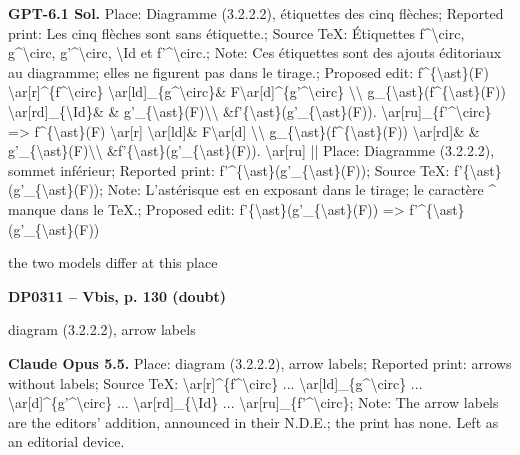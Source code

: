 \textbf{GPT-6.1 Sol.} Place: Diagramme (3.2.2.2), étiquettes des cinq flèches; Reported print: Les cinq flèches sont sans étiquette.; Source TeX: Étiquettes f\textasciicircum{}\textbackslash{}circ, g\textasciicircum{}\textbackslash{}circ, g'\textasciicircum{}\textbackslash{}circ, \textbackslash{}Id et f'\textasciicircum{}\textbackslash{}circ.; Note: Ces étiquettes sont des ajouts éditoriaux au diagramme; elles ne figurent pas dans le tirage.; Proposed edit: f\textasciicircum{}\{\textbackslash{}ast\}(F) \textbackslash{}ar[r]\textasciicircum{}\{f\textasciicircum{}\textbackslash{}circ\} \textbackslash{}ar[ld]\_\{g\textasciicircum{}\textbackslash{}circ\}\& F\textbackslash{}ar[d]\textasciicircum{}\{g'\textasciicircum{}\textbackslash{}circ\} \textbackslash{}\textbackslash{} g\_\{\textbackslash{}ast\}(f\textasciicircum{}\{\textbackslash{}ast\}(F))  \textbackslash{}ar[rd]\_\{\textbackslash{}Id\}\&             \& g'\_\{\textbackslash{}ast\}(F)\textbackslash{}\textbackslash{}                       \&f'\{\textbackslash{}ast\}(g'\_\{\textbackslash{}ast\}(F)). \textbackslash{}ar[ru]\_\{f'\textasciicircum{}\textbackslash{}circ\} =\allowbreak > f\textasciicircum{}\{\textbackslash{}ast\}(F) \textbackslash{}ar[r] \textbackslash{}ar[ld]\& F\textbackslash{}ar[d] \textbackslash{}\textbackslash{} g\_\{\textbackslash{}ast\}(f\textasciicircum{}\{\textbackslash{}ast\}(F))  \textbackslash{}ar[rd]\&             \& g'\_\{\textbackslash{}ast\}(F)\textbackslash{}\textbackslash{}                       \&f'\{\textbackslash{}ast\}(g'\_\{\textbackslash{}ast\}(F)). \textbackslash{}ar[ru] || Place: Diagramme (3.2.2.2), sommet inférieur; Reported print: f'\textasciicircum{}\{\textbackslash{}ast\}(g'\_\{\textbackslash{}ast\}(F)); Source TeX: f'\{\textbackslash{}ast\}(g'\_\{\textbackslash{}ast\}(F)); Note: L'astérisque est en exposant dans le tirage; le caractère \textasciicircum{} manque dans le TeX.; Proposed edit: f'\{\textbackslash{}ast\}(g'\_\{\textbackslash{}ast\}(F)) =\allowbreak > f'\textasciicircum{}\{\textbackslash{}ast\}(g'\_\{\textbackslash{}ast\}(F))\par
the two models differ at this place\par
\par\noindent\hypertarget{DP0311}{}\textbf{DP0311 -- Vbis, p. 130 (doubt)}\par
diagram (3.2.2.2), arrow labels\par
\textbf{Claude Opus 5.5.} Place: diagram (3.2.2.2), arrow labels; Reported print: arrows without labels; Source TeX: \textbackslash{}ar[r]\textasciicircum{}\{f\textasciicircum{}\textbackslash{}circ\} ... \textbackslash{}ar[ld]\_\{g\textasciicircum{}\textbackslash{}circ\} ... \textbackslash{}ar[d]\textasciicircum{}\{g'\textasciicircum{}\textbackslash{}circ\} ... \textbackslash{}ar[rd]\_\{\textbackslash{}Id\} ... \textbackslash{}ar[ru]\_\{f'\textasciicircum{}\textbackslash{}circ\}; Note: The arrow labels are the editors' addition, announced in their N.D.E.; the print has none. Left as an editorial device.\par
